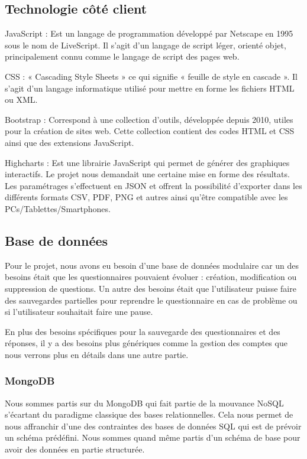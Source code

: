 \subsection{Technologie côté client}

JavaScript : Est un langage de programmation développé par Netscape en 1995 sous le nom de LiveScript. Il s'agit d'un langage de script léger, orienté objet, principalement connu comme le langage de script des pages web. \

CSS : « Cascading Style Sheets » ce qui signifie « feuille de style en cascade ». 
Il s'agit d'un langage informatique utilisé pour mettre en forme les fichiers HTML ou XML. \

Bootstrap : Correspond à une collection d'outils, développée depuis 2010, utiles pour la création de sites web. Cette collection contient des codes HTML et CSS ainsi que des extensions JavaScript. \  

Highcharts : Est une librairie JavaScript qui permet de générer des graphiques interactifs. Le projet nous demandait une certaine mise en forme des résultats. Les paramétrages s'effectuent en JSON et offrent la possibilité d'exporter dans les différents formats CSV, PDF, PNG et autres ainsi qu'être compatible avec les PCs/Tablettes/Smartphones.

\subsection{Base de données}

Pour le projet, nous avons eu besoin d'une base de données modulaire car un des besoins était que les questionnaires pouvaient évoluer : création, modification ou suppression de questions. Un autre des besoins était que l'utilisateur puisse faire des sauvegardes partielles pour reprendre le questionnaire en cas de problème ou si l'utilisateur souhaitait faire une pause. 

En plus des besoins spécifiques pour la sauvegarde des questionnaires et des réponses, il y a des besoins plus génériques comme la gestion des comptes que nous verrons plus en détails dans une autre partie.

\subsubsection{MongoDB}

Nous sommes partis sur du MongoDB qui fait partie de la mouvance NoSQL s'écartant du paradigme classique des bases relationnelles. Cela nous permet de nous affranchir d'une des contraintes des bases de données SQL qui est de prévoir un schéma prédéfini. Nous sommes quand même partis d'un schéma de base pour avoir des données en partie structurée.

